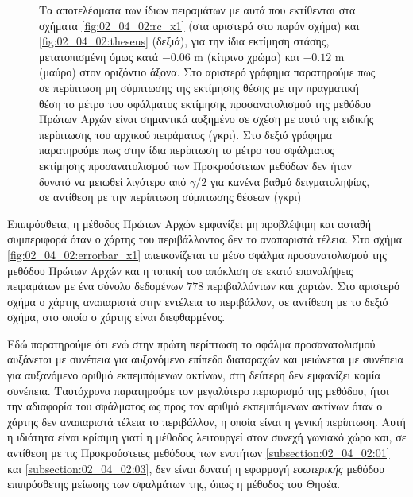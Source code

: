 \begin{figure}[!h]\centering
  \vspace{2cm}
  
  \vspace{1cm}
  \caption{\small Τα αποτελέσματα των ίδιων πειραμάτων με αυτά που εκτίθενται
           στα σχήματα \ref{fig:02_04_02:rc_x1} (στα αριστερά στο παρόν σχήμα)
           και \ref{fig:02_04_02:theseus} (δεξιά), για την ίδια εκτίμηση στάσης,
           μετατοπισμένη όμως κατά $-0.06$ m (κίτρινο χρώμα) και $-0.12$ m
           (μαύρο) στον οριζόντιο άξονα. Στο αριστερό γράφημα παρατηρούμε πως
           σε περίπτωση μη σύμπτωσης της εκτίμησης θέσης με την πραγματική θέση
           το μέτρο του σφάλματος εκτίμησης προσανατολισμού της μεθόδου Πρώτων
           Αρχών είναι σημαντικά αυξημένο σε σχέση με αυτό της ειδικής
           περίπτωσης του αρχικού πειράματος (γκρι). Στο δεξιό γράφημα
           παρατηρούμε πως στην ίδια περίπτωση το μέτρο του σφάλματος
           εκτίμησης προσανατολισμού των Προκρούστειων μεθόδων δεν ήταν δυνατό
           να μειωθεί λιγότερο από $\gamma/2$ για κανένα βαθμό δειγματοληψίας,
           σε αντίθεση με την περίπτωση σύμπτωσης θέσεων (γκρι)}
  \label{fig:02_04_02:skg_fmt_non_convergence}
\end{figure}

Επιπρόσθετα, η μέθοδος Πρώτων Αρχών εμφανίζει μη προβλέψιμη και ασταθή
συμπεριφορά όταν ο χάρτης του περιβάλλοντος δεν το αναπαριστά τέλεια. Στο σχήμα
\ref{fig:02_04_02:errorbar_x1} απεικονίζεται το μέσο σφάλμα προσανατολισμού της
μεθόδου Πρώτων Αρχών και η τυπική του απόκλιση σε εκατό επαναλήψεις πειραμάτων
με ένα σύνολο δεδομένων $778$ περιβαλλόντων και χαρτών. Στο αριστερό σχήμα ο
χάρτης αναπαριστά στην εντέλεια το περιβάλλον, σε αντίθεση με το δεξιό σχήμα,
στο οποίο ο χάρτης είναι διεφθαρμένος.

Εδώ παρατηρούμε ότι ενώ στην πρώτη περίπτωση το σφάλμα προσανατολισμού
αυξάνεται με συνέπεια για αυξανόμενο επίπεδο διαταραχών και μειώνεται με
συνέπεια για αυξανόμενο αριθμό εκπεμπόμενων ακτίνων, στη δεύτερη δεν εμφανίζει
καμία συνέπεια. Ταυτόχρονα παρατηρούμε τον μεγαλύτερο περιορισμό της μεθόδου,
ήτοι την αδιαφορία του σφάλματος ως προς τον αριθμό εκπεμπόμενων ακτίνων όταν
ο χάρτης δεν αναπαριστά τέλεια το περιβάλλον, η οποία είναι η γενική περίπτωση.
Αυτή η ιδιότητα είναι κρίσιμη γιατί η μέθοδος λειτουργεί στον συνεχή γωνιακό
χώρο και, σε αντίθεση με τις Προκρούστειες μεθόδους των ενοτήτων
\ref{subsection:02_04_02:01} και \ref{subsection:02_04_02:03}, δεν είναι δυνατή
η εφαρμογή \textit{εσωτερικής} μεθόδου επιπρόσθετης μείωσης των σφαλμάτων της,
όπως η μέθοδος του Θησέα.

